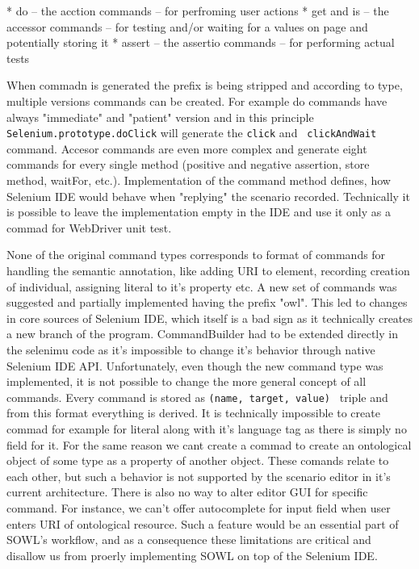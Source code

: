 \begitems
  * do -- the acction commands -- for perfroming user actions
  * get and is -- the accessor commands -- for testing and/or waiting for a
    values on page and potentially storing it
  * assert -- the assertio commands -- for performing actual tests
\enditems

When commadn is generated the prefix is being stripped and according to type,
multiple versions commands can be created. For example do commands have always
"immediate" and "patient" version and in this principle {\tt
Selenium.prototype.doClick} will generate the {\tt click} and {\tt
clickAndWait} command. Accesor commands are even more complex and generate
eight commands for every single method (positive and negative assertion, store
method, waitFor, etc.). Implementation of the command method defines, how
Selenium IDE would behave when "replying" the scenario recorded. Technically it
is possible to leave the implementation empty in the IDE and use it only as a
commad for WebDriver unit test. 

None of the original command types corresponds to format of commands for
handling the semantic annotation, like adding URI to element, recording
creation of individual, assigning literal to it's property etc. A new set of
commands was suggested and partially implemented having the prefix "owl". This
led to changes in core sources of Selenium IDE, which itself is a bad sign as
it technically creates a new branch of the program. CommandBuilder had to be
extended directly in the selenimu code as it's impossible to change it's
behavior through native Selenium IDE API. Unfortunately, even though the new
command type was implemented, it is not possible to change the more general
concept of all commands. Every command is stored as {\tt (name, target, value) }
triple and from this format everything is derived. It is technically impossible
to create commad for example for literal along with it's language tag as there
is simply no field for it. For the same reason we cant create a commad to
create an ontological object of some type as a property of another object.
These comands relate to each other, but such a behavior is not supported by the
scenario editor in it's current architecture. There is also no way to alter
editor GUI for specific command. For instance, we can't offer autocomplete for
input field when user enters URI of ontological resource. Such a feature would
be an essential part of SOWL's workflow, and as a consequence these limitations
are critical and disallow us from proerly implementing SOWL on top of the
Selenium IDE. 

